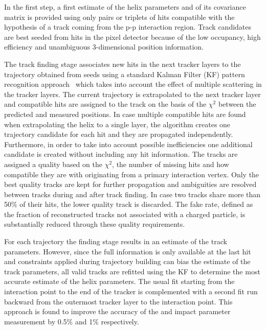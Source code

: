In the first step, a first estimate of the helix parameters and of its covariance matrix is provided using only pairs or triplets of hits compatible with the hypothesis of a track coming from the p-p interaction region. Track candidates are best seeded from hits in the pixel detector because of the low occupancy, high efficiency and unambiguous 3-dimensional position information.

The track finding stage associates new hits in the next tracker layers to the trajectory obtained from seeds using a standard Kalman Filter (KF) pattern recognition approach~\cite{Billoir:1989mh,Fruhwirth:1987fm} which takes into account the effect of multiple scattering in the tracker layers. The current trajectory is extrapolated to the next tracker layer and compatible hits are assigned to the track on the basis of the $\chi^2$ between the predicted and measured positions. In case multiple compatible hits are found when extrapolating the helix to a single layer, the algorithm creates one trajectory candidate for each hit and they are propagated independently. Furthermore, in order to take into account possible inefficiencies one additional candidate is created without including any hit information. The tracks are assigned a quality based on the $\chi^2$, the number of missing hits and how compatible they are with originating from a primary interaction vertex. Only the best quality tracks are kept for further propagation and ambiguities are resolved between tracks during and after track finding. In case two tracks share more than 50\% of their hits, the lower quality track is discarded.  The fake rate, defined as the fraction of reconstructed tracks not associated with a charged particle, is substantially reduced through these quality requirements.

For each trajectory the finding stage results in an estimate of the track parameters. However, since the full information is only available at the last hit and constraints applied during trajectory building can bias the estimate of the track parameters, all valid tracks are refitted using the KF to determine the most accurate estimate of the helix parameters. The usual fit starting from the interaction point to the end of the tracker is complemented with a second fit run backward from the outermost tracker layer to the interaction point. This approach is found to improve the accuracy of the \pt and impact parameter measurement by 0.5\% and 1\% respectively.

